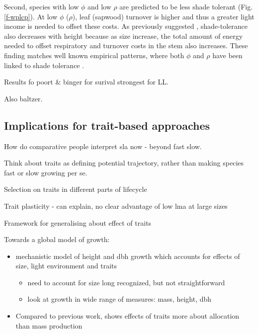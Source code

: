 \documentclass[12pt, a4paper]{article}
\begin{document}
Second, species with low $\phi$ and low $\rho$ are predicted to be
less shade tolerant (Fig. \ref{f-wplcp}). At low $\phi$ ($\rho$),
leaf (sapwood) turnover is higher and thus a greater light income is
needed to offset these costs. As previously suggested
 \citep{givnish-1988}, shade-tolerance also decreases with
height because as size increase, the total amount of energy needed to
offset respiratory and turnover costs in the stem also increases. These
finding matches well known empirical patterns, where both $\phi$ and
$\rho$ have been linked to shade tolerance \citep{poorter-2006, lusk-2008,osunkoya-1996}.

Results fo poort \& binger for surival strongest for LL.

Also baltzer.

\subsection{Implications for trait-based approaches}\label{implications-for-trait-based-approaches}

How do comparative people interpret sla now - beyond fast slow.

Think about traits as defining potential trajectory, rather than making
species fast or slow growing per se.

Selection on traits in different parts of lifecycle

Trait plasticity - can explain, no clear advantage of low lma at large
sizes

Framework for generalising about effect of traits


Towards a global model of growth:

\begin{itemize}
\itemsep1pt\parskip0pt
\item
  mechanistic model of height and dbh growth which accounts for effects
  of size, light environment and traits

  \begin{itemize}
  \itemsep1pt\parskip0pt
  \item
    need to account for size long recognized, but not straightforward
  \item
    look at growth in wide range of measures: mass, height, dbh
  \end{itemize}
\item
  Compared to previous work, shows effects of traits more about
  allocation than mass production
\end{itemize}
\end{document}
